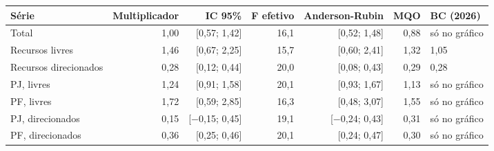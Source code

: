 \begin{tabular}{lrrrrrl}
\toprule
Série & Multiplicador & IC 95\% & F efetivo & Anderson-Rubin & MQO & BC (2026) \\
\midrule
Total & 1{,}00 & [0{,}57; 1{,}42] & 16{,}1 & [0{,}52; 1{,}48] & 0{,}88 & só no gráfico \\
Recursos livres & 1{,}46 & [0{,}67; 2{,}25] & 15{,}7 & [0{,}60; 2{,}41] & 1{,}32 & 1{,}05 \\
Recursos direcionados & 0{,}28 & [0{,}12; 0{,}44] & 20{,}0 & [0{,}08; 0{,}43] & 0{,}29 & 0{,}28 \\
PJ, livres & 1{,}24 & [0{,}91; 1{,}58] & 20{,}1 & [0{,}93; 1{,}67] & 1{,}13 & só no gráfico \\
PF, livres & 1{,}72 & [0{,}59; 2{,}85] & 16{,}3 & [0{,}48; 3{,}07] & 1{,}55 & só no gráfico \\
PJ, direcionados & 0{,}15 & [\ensuremath{-}0{,}15; 0{,}45] & 19{,}1 & [\ensuremath{-}0{,}24; 0{,}43] & 0{,}31 & só no gráfico \\
PF, direcionados & 0{,}36 & [0{,}25; 0{,}46] & 20{,}1 & [0{,}24; 0{,}47] & 0{,}30 & só no gráfico \\
\bottomrule
\end{tabular}
